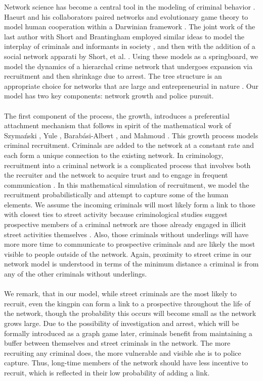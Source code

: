 \documentclass[11pt]{article}
\theoremstyle{plain}
\theoremstyle{definition}
\begin{document}
Network science has become a central tool in the modeling of criminal behavior \cite{mcIllwain, browning, tita}.  Haeurt and his collaborators paired networks and evolutionary game theory to model human cooperation within a Darwinian framework \cite{Hauert1, Hauert2, Hauert3}.  The joint work of the last author with Short and Brantingham employed similar ideas to model the interplay of criminals and informants in society \cite{maria2010, maria2012}, and then with the addition of a social network apparati by Short, et al. \cite{mccallaEGT}.   Using these models as a springboard, we model the dynamics of a hierarchal crime network that undergoes expansion via recruitment and then shrinkage due to arrest.  The tree structure is an appropriate choice for networks that are large and entrepreneurial in nature \cite{crime1, crime2}.  Our model has two key components: network growth and police pursuit.\\  
\\
The first component of the process, the growth, introduces a preferential attachment mechanism that follows in spirit of the mathematical work of Szyma\'{n}ski \cite{sz}, Yule \cite{Yule}, Barab\'{a}si-Albert \cite{BA1}, and Mahmoud \cite{Mahmoud1, Mahmoud2}.  This growth process models criminal recruitment.  Criminals are added to the network at a constant rate and each form a unique connection to the existing network.  In criminology, recruitment into a criminal network is a complicated process that involves both the recruiter and the network to acquire trust and to engage in frequent communication \cite{recruitment1, recruitment2}.  In this mathematical simulation of recruitment, we model the recruitment probabilistically and attempt to capture some of the human elements.  We assume the incoming criminals will most likely form a link to those with closest ties to street activity because criminological studies suggest prospective members of a criminal network are those already engaged in illicit street activities themselves \cite{recruitment1}.  Also, those criminals without underlings will have more more time to communicate to prospective criminals and are likely the most visible to people outside of the network.  Again, proximity to street crime in our network model is understood in terms of the minimum distance a criminal is from any of the other criminals without underlings.\\
\\
We remark, that in our model, while street criminals are the most likely to recruit, even the kingpin can form a link to a prospective throughout the life of the network, though the probability this occurs will become small as the network grows large.  Due to the possibility of investigation and arrest, which will be formally introduced as a graph game later, criminals benefit from maintaining a buffer between themselves and street criminals in the network.   The more recruiting any criminal does, the more vulnerable and visible she is to police capture.  Thus, long-time members of the network should have less incentive to recruit, which is reflected in their low probability of adding a link.\\
\end{document}

